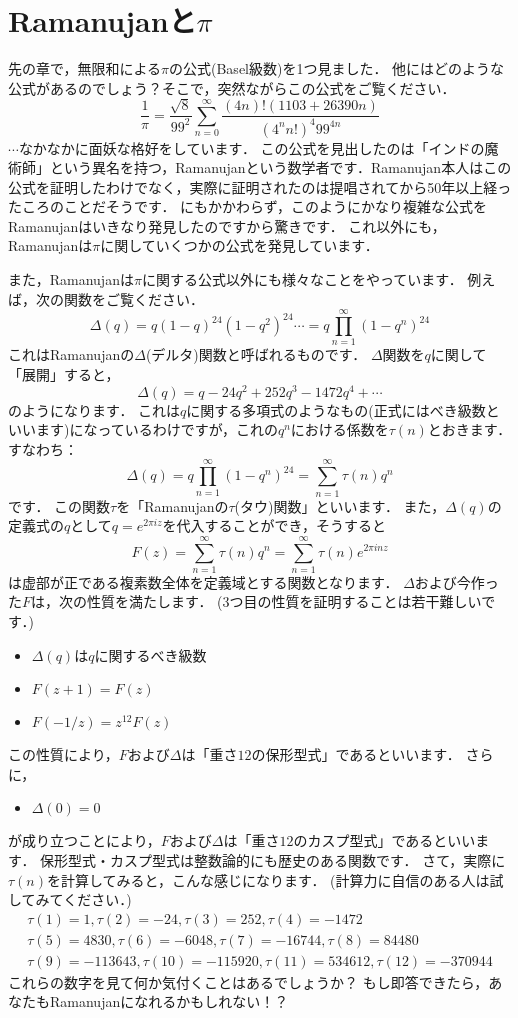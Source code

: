 \section{Ramanujanと$\pi$}
先の章で，無限和による$\pi$の公式(Basel級数)を1つ見ました．
他にはどのような公式があるのでしょう？そこで，突然ながらこの公式をご覧ください．
\[
\frac{1}{\pi}=\frac{\sqrt{8}}{99^2} \sum_{n=0}^{\infty}\frac{(4n)! (1103+26390n)}{(4^{n}n!)^{4}99^{4n}}
\]
$\cdots$なかなかに面妖な格好をしています．
この公式を見出したのは「インドの魔術師」という異名を持つ，Ramanujanという数学者です．Ramanujan本人はこの公式を証明したわけでなく，実際に証明されたのは提唱されてから50年以上経ったころのことだそうです．
にもかかわらず，このようにかなり複雑な公式をRamanujanはいきなり発見したのですから驚きです．
これ以外にも，Ramanujanは$\pi$に関していくつかの公式を発見しています．

また，Ramanujanは$\pi$に関する公式以外にも様々なことをやっています．
例えば，次の関数をご覧ください．
\[
  \Delta (q)=q(1-q)^{24}(1-q^{2})^{24} \cdots = q\prod_{n=1}^{\infty}(1-q^n)^{24}
\]
これはRamanujanの$\Delta$(デルタ)関数と呼ばれるものです．
$\Delta$関数を$q$に関して「展開」すると，
\[
	\Delta (q)=q-24q^{2}+252q^{3}-1472q^{4}+\cdots
\]
のようになります．
これは$q$に関する多項式のようなもの(正式にはべき級数といいます)になっているわけですが，これの$q^n$における係数を$\tau (n)$とおきます．
すなわち：
\[
	\Delta (q)=q\prod_{n=1}^{\infty}(1-q^n)^{24} = \sum_{n=1}^{\infty} \tau (n) q^{n}
\]
です．
この関数$\tau$を「Ramanujanの$\tau$(タウ)関数」といいます．
また，$\Delta(q)$の定義式の$q$として$q=e^{2\pi iz}$を代入することができ，そうすると
\[
	F(z)=\sum_{n=1}^{\infty} \tau (n) q^{n}=\sum_{n=1}^{\infty} \tau (n) e^{2 \pi inz}
\]
は虚部が正である複素数全体を定義域とする関数となります．
$\Delta$および今作った$F$は，次の性質を満たします．
(3つ目の性質を証明することは若干難しいです．)
\begin{itemize}
	\item $\Delta (q)$は$q$に関するべき級数
	\item $F(z+1)=F(z)$
	\item $F(-1/z)=z^{12} F(z)$
\end{itemize}
この性質により，$F$および$\Delta$は「重さ$12$の保形型式」であるといいます．
さらに，
\begin{itemize}
	\item $\Delta(0)=0$
\end{itemize}
が成り立つことにより，$F$および$\Delta$は「重さ$12$のカスプ型式」であるといいます．
保形型式・カスプ型式は整数論的にも歴史のある関数です．
さて，実際に$\tau (n)$を計算してみると，こんな感じになります．
(計算力に自信のある人は試してみてください．)
\begin{eqnarray*}
\tau(1)=1, \tau(2)=-24, \tau(3)=252, \tau(4)=-1472 \\
\tau (5)=4830, \tau(6)=-6048, \tau(7)=-16744, \tau(8)=84480 \\
\tau(9)=-113643, \tau(10)=-115920, \tau(11)=534612, \tau(12)=-370944
\end{eqnarray*}
これらの数字を見て何か気付くことはあるでしょうか？
もし即答できたら，あなたもRamanujanになれるかもしれない！？


